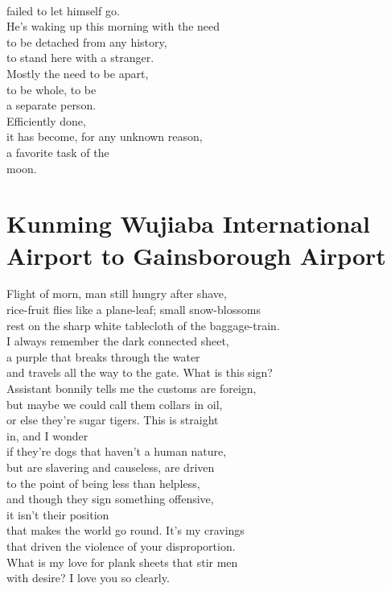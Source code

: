 \documentclass[smalldemyvopaper,11pt,twoside,onecolumn,openright,extrafontsizes]{memoir}
\begin{document}
\\failed to let himself go.
\\He's waking up this morning with the need
\\to be detached from any history,
\\to stand here with a stranger.
\\Mostly the need to be apart,
\\to be whole, to be
\\a separate person.
\\Efficiently done,
\\it has become, for any unknown reason,
\\a favorite task of the
\\moon.



\chapter{Kunming Wujiaba International Airport to Gainsborough Airport}
Flight of morn, man still hungry after shave,
\\rice-fruit flies like a plane-leaf; small snow-blossoms
\\rest on the sharp white tablecloth of the baggage-train.
\\I always remember the dark connected sheet,
\\a purple that breaks through the water
\\and travels all the way to the gate. What is this sign?
\\Assistant bonnily tells me the customs are foreign,
\\but maybe we could call them collars in oil,
\\or else they're sugar tigers. This is straight
\\in, and I wonder
\\if they're dogs that haven't a human nature,
\\but are slavering and causeless, are driven
\\to the point of being less than helpless,
\\and though they sign something offensive,
\\it isn't their position
\\that makes the world go round. It's my cravings
\\that driven the violence of your disproportion.
\\What is my love for plank sheets that stir men
\\with desire? I love you so clearly.
\end{document}
